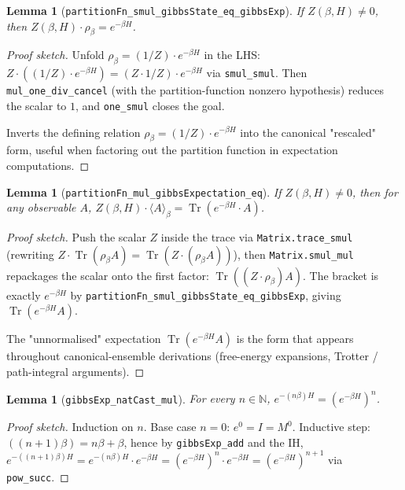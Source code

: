 \documentclass[a4paper,11pt]{article}
\newtheorem{lemma}[theorem]{Lemma}
\begin{document}
\begin{lemma}[\texttt{partitionFn\_smul\_gibbsState\_eq\_gibbsExp}]
If $Z(\beta, H) \neq 0$, then
$Z(\beta, H) \cdot \rho_\beta = e^{-\beta H}$.
\end{lemma}

\begin{proof}[Proof sketch]
Unfold $\rho_\beta = (1/Z) \cdot e^{-\beta H}$ in the LHS:
$Z \cdot ((1/Z) \cdot e^{-\beta H})
 = (Z \cdot 1/Z) \cdot e^{-\beta H}$
via \texttt{smul\_smul}.  Then \texttt{mul\_one\_div\_cancel} (with
the partition-function nonzero hypothesis) reduces the scalar to $1$,
and \texttt{one\_smul} closes the goal.

Inverts the defining relation $\rho_\beta = (1/Z) \cdot e^{-\beta H}$
into the canonical "rescaled" form, useful when factoring out the
partition function in expectation computations.
\end{proof}

\begin{lemma}[\texttt{partitionFn\_mul\_gibbsExpectation\_eq}]
If $Z(\beta, H) \neq 0$, then for any observable $A$,
$Z(\beta, H) \cdot \langle A \rangle_\beta
 = \operatorname{Tr}(e^{-\beta H} \cdot A)$.
\end{lemma}

\begin{proof}[Proof sketch]
Push the scalar $Z$ inside the trace via
\texttt{Matrix.trace\_smul} (rewriting
$Z \cdot \operatorname{Tr}(\rho_\beta A)
 = \operatorname{Tr}(Z \cdot (\rho_\beta A))$),
then \texttt{Matrix.smul\_mul} repackages the scalar onto the first
factor: $\operatorname{Tr}((Z \cdot \rho_\beta) A)$.
The bracket is exactly $e^{-\beta H}$ by
\texttt{partitionFn\_smul\_gibbsState\_eq\_gibbsExp}, giving
$\operatorname{Tr}(e^{-\beta H} A)$.

The "unnormalised" expectation $\operatorname{Tr}(e^{-\beta H} A)$ is
the form that appears throughout canonical-ensemble derivations
(free-energy expansions, Trotter / path-integral arguments).
\end{proof}

\begin{lemma}[\texttt{gibbsExp\_natCast\_mul}]
For every $n \in \mathbb{N}$,
$e^{-(n\beta) H} = (e^{-\beta H})^n$.
\end{lemma}

\begin{proof}[Proof sketch]
Induction on $n$. Base case $n = 0$: $e^{0} = I = M^0$. Inductive
step: $((n+1)\beta) = n\beta + \beta$, hence by \texttt{gibbsExp\_add}
and the IH,
$e^{-((n+1)\beta) H} = e^{-(n\beta) H} \cdot e^{-\beta H}
                    = (e^{-\beta H})^n \cdot e^{-\beta H}
                    = (e^{-\beta H})^{n+1}$
via \texttt{pow\_succ}.
\end{proof}
\end{document}
